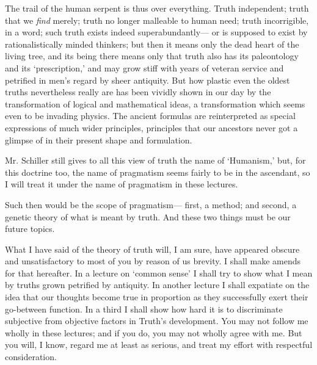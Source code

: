 \documentclass[]{article}
\begin{document}
The trail of the human serpent is thus over everything. Truth
independent; truth that we \emph{find} merely; truth no longer malleable to
human need; truth incorrigible, in a word; such truth exists indeed
superabundantly--- or is supposed to exist by rationalistically minded
thinkers; but then it means only the dead heart of the living tree, and
its being there means only that truth also has its paleontology and its
`prescription,' and may grow stiff with years of veteran service and
petrified in men's regard by sheer antiquity. But how plastic even the
oldest truths nevertheless really are has been vividly shown in our
day by the transformation of logical and mathematical ideas, a
transformation which seems even to be invading physics. The ancient
formulas are reinterpreted as special expressions of much wider
principles, principles that our ancestors never got a glimpse of in
their present shape and formulation.

Mr. Schiller still gives to all this view of truth the name of
`Humanism,' but, for this doctrine too, the name of pragmatism seems
fairly to be in the ascendant, so I will treat it under the name of
pragmatism in these lectures.

Such then would be the scope of pragmatism--- first, a method; and second,
a genetic theory of what is meant by truth. And these two things must be
our future topics.

What I have said of the theory of truth will, I am sure, have appeared
obscure and unsatisfactory to most of you by reason of us brevity. I
shall make amends for that hereafter. In a lecture on `common sense' I
shall try to show what I mean by truths grown petrified by antiquity. In
another lecture I shall expatiate on the idea that our thoughts become
true in proportion as they successfully exert their go-between function.
In a third I shall show how hard it is to discriminate subjective from
objective factors in Truth's development. You may not follow me wholly
in these lectures; and if you do, you may not wholly agree with me. But
you will, I know, regard me at least as serious, and treat my effort
with respectful consideration.
\end{document}
